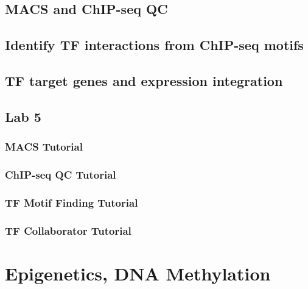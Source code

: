 \documentclass[
]{book}
\begin{document}
\hypertarget{macs-and-chip-seq-qc}{%
\section{MACS and ChIP-seq QC}\label{macs-and-chip-seq-qc}}

\hypertarget{identify-tf-interactions-from-chip-seq-motifs}{%
\section{Identify TF interactions from ChIP-seq motifs}\label{identify-tf-interactions-from-chip-seq-motifs}}

\hypertarget{tf-target-genes-and-expression-integration}{%
\section{TF target genes and expression integration}\label{tf-target-genes-and-expression-integration}}

\hypertarget{lab-5}{%
\section{Lab 5}\label{lab-5}}

\hypertarget{macs-tutorial}{%
\subsection{MACS Tutorial}\label{macs-tutorial}}

\hypertarget{chip-seq-qc-tutorial}{%
\subsection{ChIP-seq QC Tutorial}\label{chip-seq-qc-tutorial}}

\hypertarget{tf-motif-finding-tutorial}{%
\subsection{TF Motif Finding Tutorial}\label{tf-motif-finding-tutorial}}

\hypertarget{tf-collaborator-tutorial}{%
\subsection{TF Collaborator Tutorial}\label{tf-collaborator-tutorial}}

\hypertarget{epi}{%
\chapter{Epigenetics, DNA Methylation}\label{epi}}
\end{document}
